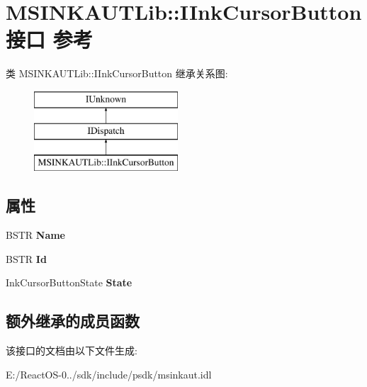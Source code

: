 \hypertarget{interface_m_s_i_n_k_a_u_t_lib_1_1_i_ink_cursor_button}{}\section{M\+S\+I\+N\+K\+A\+U\+T\+Lib\+:\+:I\+Ink\+Cursor\+Button接口 参考}
\label{interface_m_s_i_n_k_a_u_t_lib_1_1_i_ink_cursor_button}
类 M\+S\+I\+N\+K\+A\+U\+T\+Lib\+:\+:I\+Ink\+Cursor\+Button 继承关系图\+:\begin{figure}[H]
\begin{center}
\leavevmode
\includegraphics[height=3.000000cm]{interface_m_s_i_n_k_a_u_t_lib_1_1_i_ink_cursor_button}
\end{center}
\end{figure}
\subsection*{属性}
\begin{DoxyCompactItemize}
\item 
\mbox{\label{interface_m_s_i_n_k_a_u_t_lib_1_1_i_ink_cursor_button_a13070a65200a6b079cffed5af3b08a21}} 
B\+S\+TR {\bfseries Name}
\item 
\mbox{\label{interface_m_s_i_n_k_a_u_t_lib_1_1_i_ink_cursor_button_a57306ab52909eea0e113096d04e9819e}} 
B\+S\+TR {\bfseries Id}
\item 
\mbox{\label{interface_m_s_i_n_k_a_u_t_lib_1_1_i_ink_cursor_button_a03ec65bb6e3330c26e2d1eb64bbc8e94}} 
Ink\+Cursor\+Button\+State {\bfseries State}
\end{DoxyCompactItemize}
\subsection*{额外继承的成员函数}


该接口的文档由以下文件生成\+:\begin{DoxyCompactItemize}
\item 
E\+:/\+React\+O\+S-\/0../sdk/include/psdk/msinkaut.\+idl\end{DoxyCompactItemize}
